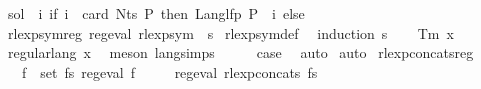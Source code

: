 \begin{isabellebody}
\isanewline
{}\isamarkupfalse%
\ {\isachardoublequoteopen}sol\ {\isasymequiv}\ {\isasymlambda}i{\isachardot}{\kern0pt}\ if\ i\ {\isacharless}{\kern0pt}\ card\ {\isacharparenleft}{\kern0pt}Nts\ P{\isacharparenright}{\kern0pt}\ then\ Lang{\isacharunderscore}{\kern0pt}lfp\ P\ {\isacharparenleft}{\kern0pt}{\isasymgamma}\ i{\isacharparenright}{\kern0pt}\ else\ {\isacharbraceleft}{\kern0pt}{\isacharbraceright}{\kern0pt}{\isachardoublequoteclose}\isanewline
\isanewline
{}\isamarkupfalse%
\ rlexp{\isacharunderscore}{\kern0pt}sym{\isacharunderscore}{\kern0pt}reg{\isacharcolon}{\kern0pt}\ {\isachardoublequoteopen}reg{\isacharunderscore}{\kern0pt}eval\ {\isacharparenleft}{\kern0pt}rlexp{\isacharunderscore}{\kern0pt}sym\ {\isasymgamma}{\isacharprime}{\kern0pt}\ s{\isacharparenright}{\kern0pt}{\isachardoublequoteclose}\isanewline
%
\isadelimproof
%
\endisadelimproof
%
\isatagproof
{}\isamarkupfalse%
\ rlexp{\isacharunderscore}{\kern0pt}sym{\isacharunderscore}{\kern0pt}def\ \isamarkupfalse%
\ {\isacharparenleft}{\kern0pt}induction\ s{\isacharparenright}{\kern0pt}\isanewline
\ \ \isamarkupfalse%
\ {\isacharparenleft}{\kern0pt}Tm\ x{\isacharparenright}{\kern0pt}\isanewline
\ \ \isamarkupfalse%
\ {\isachardoublequoteopen}regular{\isacharunderscore}{\kern0pt}lang\ {\isacharbraceleft}{\kern0pt}{\isacharbrackleft}{\kern0pt}x{\isacharbrackright}{\kern0pt}{\isacharbraceright}{\kern0pt}{\isachardoublequoteclose}\ \isamarkupfalse%
\ {\isacharparenleft}{\kern0pt}meson\ lang{\isachardot}{\kern0pt}simps{\isacharparenleft}{\kern0pt}{}{\isacharparenright}{\kern0pt}{\isacharparenright}{\kern0pt}\isanewline
\ \ \isamarkupfalse%
\ \isamarkupfalse%
\ {\isacharquery}{\kern0pt}case\ \isamarkupfalse%
\ auto\isanewline
{}\isamarkupfalse%
\ auto%
\endisatagproof
{\isafoldproof}%
%
\isadelimproof
\isanewline
%
\endisadelimproof
\isanewline
{}\isamarkupfalse%
\ rlexp{\isacharunderscore}{\kern0pt}concats{\isacharunderscore}{\kern0pt}reg{\isacharcolon}{\kern0pt}\isanewline
\ \ \ {\isachardoublequoteopen}{\isasymforall}f\ {\isasymin}\ set\ fs{\isachardot}{\kern0pt}\ reg{\isacharunderscore}{\kern0pt}eval\ f{\isachardoublequoteclose}\isanewline
\ \ \ \ \ {\isachardoublequoteopen}reg{\isacharunderscore}{\kern0pt}eval\ {\isacharparenleft}{\kern0pt}rlexp{\isacharunderscore}{\kern0pt}concats\ fs{\isacharparenright}{\kern0pt}{\isachardoublequoteclose}\isanewline

\end{isabellebody}
